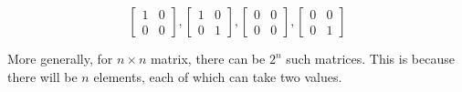 \begin{enumerate}
\[
\left[\begin{array}{ll}
1 & 0 \\
0 & 0
\end{array}\right],\left[\begin{array}{ll}
1 & 0 \\
0 & 1
\end{array}\right],\left[\begin{array}{ll}
0 & 0 \\
0 & 0
\end{array}\right],\left[\begin{array}{ll}
0 & 0 \\
0 & 1
\end{array}\right]
\]

More generally, for $n \times n$ matrix, there can be $2^{n}$ such matrices. This is because there will be $n$ elements, each of which can take two values.
\end{enumerate}



